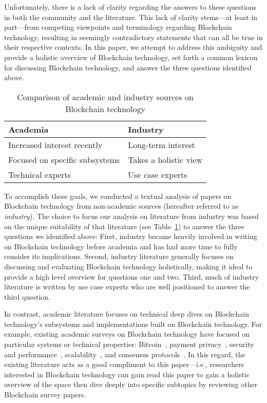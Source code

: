 Unfortunately, there is a lack of clarity regarding the answers to these questions in both the community and the literature.
This lack of clarity stems---at least in part---from competing viewpoints and terminology regarding Blockchain technology, resulting in seemingly contradictory statements that can all be true in their respective contexts.
In this paper, we attempt to address this ambiguity and provide a holistic overview of Blockchain technology, set forth a common lexicon for discussing Blockchain technology, and answer the three questions identified above.

\begin{table}
	\centering
	
	\begin{tabular}{l|l}
		\textbf{Academia} & \textbf{Industry} \\
		\hline
		
		Increased interest recently & Long-term interest \\
		Focused on specific subsystems & Takes a holistic view \\
		Technical experts & Use case experts \\ \hline
	\end{tabular}
	
	\caption{Comparison of academic and industry sources on Blockchain technology}
	\label{tab:sources}
\end{table}

To accomplish these goals, we conducted a textual analysis of papers on Blockchain technology from non-academic sources (hereafter referred to as \emph{industry}).
The choice to focus our analysis on literature from industry was based on the unique suitability of that literature (see Table~\ref{tab:sources}) to answer the three questions we identified above:
First, industry became heavily involved in writing on Blockchain technology before academia and has had more time to fully consider its implications.
Second, industry literature generally focuses on discussing and evaluating Blockchain technology holistically, making it ideal to provide a high level overview for questions one and two.
Third, much of industry literature is written by use case experts who are well positioned to answer the third question.

In contrast, academic literature focuses on technical deep dives on Blockchain technology's subsystems and implementations built on Blockchain technology.
For example, existing academic surveys on Blockchain technology have focused on particular systems or technical properties: Bitcoin~\cite{BMC+15,Narayanan17}, payment privacy~\cite{Conti17}, security and performance~\cite{Gervais16}, scalability~\cite{Croman16}, and consensus protocols~\cite{Bano17,garay2018consensus}.
In this regard, the existing literature acts as a good compliment to this paper---i.e., researchers interested in Blockchain technology can gain read this paper to gain a holistic overview of the space then dive deeply into specific subtopics by reviewing other Blockchain survey papers.

